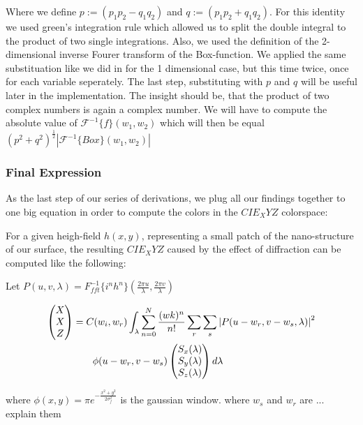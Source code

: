 Where we define $p := (p_1 p_2 - q_1 q_2) $ and $q := (p_1 p_2 + q_1 q_2)$. For this identity we used green's integration rule which allowed us to split the double integral to the product of two single integrations. Also, we used the definition of the 2-dimensional inverse Fourer transform of the Box-function. We applied the same substituation like we did in for the 1 dimensional case, but this time twice, once for each variable seperately. The last step, substituting with $p$ and $q$ will be useful later in the implementation. The insight should be, that the product of two complex numbers is again a complex number. We will have to compute the absolute value of $\mathcal{F}^{-1}\{f\}(w_1,w_2)$ which will then be equal $(p^2 + q^2)^{\frac{1}{2}}\left|\mathcal{F}^{-1}\{Box\}(w_1,w_2)\right|$

\subsubsection{Final Expression}
As the last step of our series of derivations, we plug all our findings together to one big equation in order to compute the colors in the $CIE_XYZ$ colorspace:

For a given heigh-field $h(x,y)$, representing a small patch of the nano-structure of our surface, the resulting $CIE_XYZ$ caused by the effect of diffraction can be computed like the following: 

Let $P(u,v,\lambda) = {F}_{fft}^{-1}\{i^n h^n\}(\frac{2\pi u}{\lambda},\frac{2\pi v}{\lambda})$

\begin{equation}
\begin{split}
\colvec[X]{X}{Z}& = C(w_i,w_r) \int_{\lambda} \sum_{n=0}^N  \frac{(wk)^n}{n!} \sum_r \sum_s \left| P(u-w_r,v-w_s,\lambda) \right|^2 \\
& \quad \quad  \phi(u-w_r, v-w_s) \colvec[S_x(\lambda)]{S_y(\lambda)}{S_z(\lambda)}d\lambda
\end{split}
\end{equation}

where $\phi(x,y) = \pi e^{-\frac{x^2 + y^2}{2\sigma_{f}^2}}$ is the gaussian window.
where $w_s$ and $w_r$ are ... explain them


